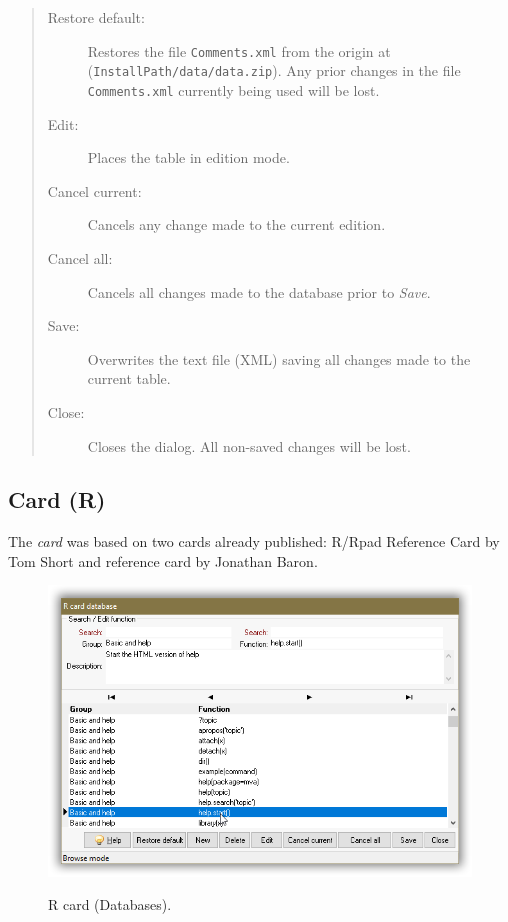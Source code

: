 \begin{quote}
  \begin{footnotesize}
    \begin{description}
      \item[Restore default:]
        Restores the file \texttt{Comments.xml} from the origin at
        (\texttt{InstallPath/data/data.zip}). Any prior changes in the
        file \texttt{Comments.xml} currently being used will be lost.
      \item[Edit:]
        Places the table in edition mode.
      \item[Cancel current:]
        Cancels any change made to the current edition.
      \item[Cancel all:]
        Cancels all changes made to the database prior to \textit{Save}.
      \item[Save:]
        Overwrites the text file (XML) saving all changes made to the current table.
      \item[Close:]
        Closes the dialog. All non-saved changes will be lost.
    \end{description}
  \end{footnotesize}
\end{quote}


\subsection{Card (R)}

The \textit{card} was based on two \RR{} cards already published:
R/Rpad Reference Card by Tom Short and \RR{} reference card by Jonathan Baron.

\begin{figure}[H]
  \includegraphics[scale=0.35]{./res/rcard_dlg.png}\\
  \caption{R card (Databases).}
  \label{fig:rcard_dlg_1}
\end{figure}


